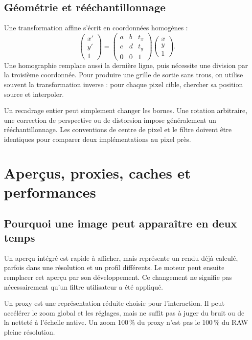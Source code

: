 \subsection{Géométrie et rééchantillonnage}
Une transformation affine s'écrit en coordonnées
homogènes :
\begin{equation}
\begin{pmatrix}x'\\y'\\1\end{pmatrix}=
\begin{pmatrix}a&b&t_x\\c&d&t_y\\0&0&1\end{pmatrix}
\begin{pmatrix}x\\y\\1\end{pmatrix}.
\end{equation}
Une homographie remplace aussi la dernière ligne,
puis nécessite une division par la troisième
coordonnée. Pour produire une grille de sortie
sans trous, on utilise souvent la transformation
inverse : pour chaque pixel cible, chercher sa
position source et interpoler.

Un recadrage entier peut simplement changer les
bornes. Une rotation arbitraire, une correction
de perspective ou de distorsion impose généralement
un rééchantillonnage. Les conventions de centre
de pixel et le filtre doivent être identiques
pour comparer deux implémentations au pixel près.

\section{Aperçus, proxies, caches et performances}
\subsection{Pourquoi une image peut apparaître en deux temps}
Un aperçu intégré est rapide à afficher, mais représente
un rendu déjà calculé, parfois dans une résolution
et un profil différents. Le moteur peut ensuite
remplacer cet aperçu par son développement. Ce
changement ne signifie pas nécessairement qu'un
filtre utilisateur a été appliqué.

Un proxy est une représentation réduite choisie
pour l'interaction. Il peut accélérer le zoom
global et les réglages, mais ne suffit pas à
juger du bruit ou de la netteté à l'échelle native.
Un zoom 100\,\% du proxy n'est pas le 100\,\%
du RAW pleine résolution.

